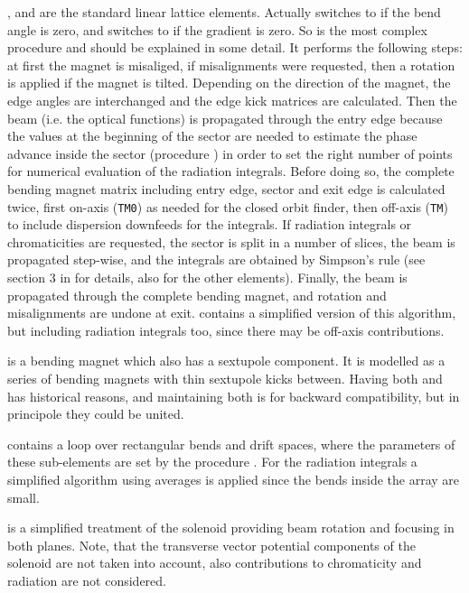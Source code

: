 \documentclass[12pt]{article}
\newcommand\code[1]{{\tt #1}}
\newcommand{\unico}[1]{{\color{burntorange}\code{#1}}}
\begin{document}
\unico{DriftSpace}, \unico{Quadrupole} and \unico{Bending} are the standard linear lattice elements. Actually \unico{Bending} switches to \unico{Quadrupole} if the bend angle is zero, and \unico{Quadrupole} switches to \unico{Driftspace} if the gradient is zero. 
So \unico{Bending} is the most complex procedure and should be explained in some detail. It performs the following steps: at first the magnet is misaliged, if misalignments were requested, then a rotation is applied if the magnet is tilted. Depending on the direction of the magnet, the edge angles are interchanged and the edge kick matrices are calculated. Then the beam (i.e. the optical functions) is propagated through the entry edge because the values at the beginning of the sector are needed to estimate the phase advance inside the sector (procedure \unico{getdtune}) in order to set the right number of points for numerical evaluation of the radiation integrals. Before doing so, the complete bending magnet matrix including entry edge, sector and exit edge is calculated twice, first on-axis (\code{TM0}) as needed for the closed orbit finder, then off-axis (\code{TM}) to include dispersion downfeeds for the integrals. If radiation integrals or chromaticities are requested, the sector is split in a number of slices, the beam is propagated step-wise, and the integrals are obtained by Simpson's rule (see section 3 in \cite{inside} for details, also for the other elements). Finally, the beam is propagated through the complete bending magnet, and rotation and misalignments are undone at exit. \unico{Quadrupole} contains a simplified version of this algorithm, but including radiation integrals too, since there may be off-axis contributions.

\unico{Combined} is a bending magnet which also has a sextupole component. It is modelled as a series of bending magnets with thin sextupole kicks between. Having both \unico{Combined} and \unico{Bending} has historical reasons, and maintaining both is for backward compatibility, but in principole they could be united.

\unico{Undulator} contains a loop over rectangular bends and drift spaces, where the parameters of these sub-elements are set by the procedure \unico{UnduFacs}. For the radiation integrals a simplified algorithm using averages is applied since the bends inside the array are small.

\unico{Solenoid} is a simplified treatment of the solenoid providing beam rotation and focusing in both planes. Note, that the transverse vector potential components of the solenoid are not taken into account, also contributions to chromaticity and radiation are not considered.
\end{document}
